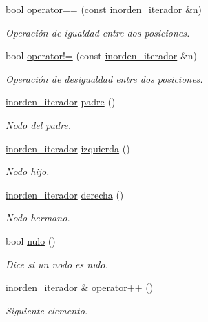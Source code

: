 \begin{DoxyCompactItemize}
\item 
bool \hyperlink{classArbolGeneral_1_1inorden__iterador_af19eeb8f37343e3f1c472f3f47818cac}{operator==} (const \hyperlink{classArbolGeneral_1_1inorden__iterador}{inorden\-\_\-iterador} \&n)
\begin{DoxyCompactList}\small\item\em Operación de igualdad entre dos posiciones. \end{DoxyCompactList}\item 
bool \hyperlink{classArbolGeneral_1_1inorden__iterador_a00c8e1e90772d16dc0c0e59c45f44fb6}{operator!=} (const \hyperlink{classArbolGeneral_1_1inorden__iterador}{inorden\-\_\-iterador} \&n)
\begin{DoxyCompactList}\small\item\em Operación de desigualdad entre dos posiciones. \end{DoxyCompactList}\item 
\hyperlink{classArbolGeneral_1_1inorden__iterador}{inorden\-\_\-iterador} \hyperlink{classArbolGeneral_1_1inorden__iterador_ae4b1e23e86b54e03288398f7dca60cea}{padre} ()
\begin{DoxyCompactList}\small\item\em Nodo del padre. \end{DoxyCompactList}\item 
\hyperlink{classArbolGeneral_1_1inorden__iterador}{inorden\-\_\-iterador} \hyperlink{classArbolGeneral_1_1inorden__iterador_acfcff093a9e0d3869ec180f053393e0c}{izquierda} ()
\begin{DoxyCompactList}\small\item\em Nodo hijo. \end{DoxyCompactList}\item 
\hyperlink{classArbolGeneral_1_1inorden__iterador}{inorden\-\_\-iterador} \hyperlink{classArbolGeneral_1_1inorden__iterador_a374dc7ff5ed5e568ca496f103cf73a5d}{derecha} ()
\begin{DoxyCompactList}\small\item\em Nodo hermano. \end{DoxyCompactList}\item 
bool \hyperlink{classArbolGeneral_1_1inorden__iterador_ab4f05a51c5ddba4ca127f2440a3e3963}{nulo} ()
\begin{DoxyCompactList}\small\item\em Dice si un nodo es nulo. \end{DoxyCompactList}\item 
\hyperlink{classArbolGeneral_1_1inorden__iterador}{inorden\-\_\-iterador} \& \hyperlink{classArbolGeneral_1_1inorden__iterador_adae1260c6d315f40e7e7128145d5ec08}{operator++} ()
\begin{DoxyCompactList}\small\item\em Siguiente elemento. \end{DoxyCompactList}\end{DoxyCompactItemize}

